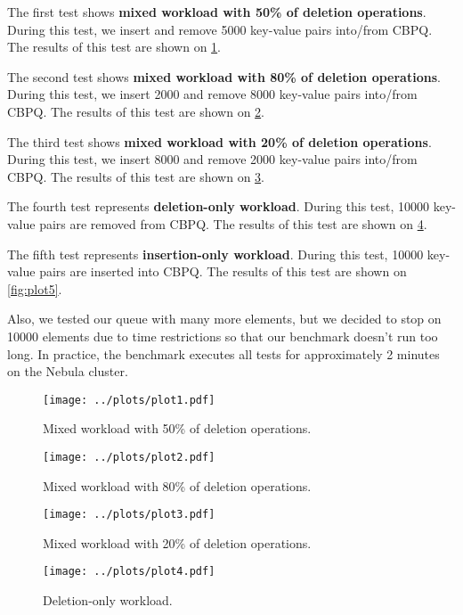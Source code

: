 \documentclass{article}
\begin{document}
The first test shows\textbf{ mixed workload with 50\% of deletion operations}. During this test, we insert and remove 5000 key-value pairs into/from CBPQ. The results of this test are shown on \cref{fig:plot1}.\par

The second test shows \textbf{mixed workload with 80\% of deletion operations}. During this test, we insert 2000 and remove 8000 key-value pairs into/from CBPQ. The results of this test are shown on \cref{fig:plot2}.\par

The third test shows \textbf{mixed workload with 20\% of deletion operations}. During this test, we insert 8000 and remove 2000 key-value pairs into/from CBPQ. The results of this test are shown on \cref{fig:plot3}.\par

The fourth test represents \textbf{deletion-only workload}. During this test, 10000 key-value pairs are removed from CBPQ. The results of this test are shown on \cref{fig:plot4}.\par

The fifth test represents \textbf{insertion-only workload}. During this test, 10000 key-value pairs are inserted into CBPQ. The results of this test are shown on \cref{fig:plot5}.\par

Also, we tested our queue with many more elements, but we decided to stop on 10000 elements due to time restrictions so that our benchmark doesn't run too long. In practice, the benchmark executes all tests for approximately 2 minutes on the Nebula cluster.

\begin{figure}[H]
  \centering
  \texttt{[image: ../plots/plot1.pdf]}
  \caption{Mixed workload with 50\% of deletion operations.}
  \label{fig:plot1}
\end{figure}

\begin{figure}[H]
  \centering
  \texttt{[image: ../plots/plot2.pdf]}
  \caption{Mixed workload with 80\% of deletion operations.}
  \label{fig:plot2}
\end{figure}

\begin{figure}[H]
  \centering
  \texttt{[image: ../plots/plot3.pdf]}
  \caption{Mixed workload with 20\% of deletion operations.}
  \label{fig:plot3}
\end{figure}

\begin{figure}[H]
  \centering
  \texttt{[image: ../plots/plot4.pdf]}
  \caption{Deletion-only workload.}
  \label{fig:plot4}
\end{figure}
\end{document}
